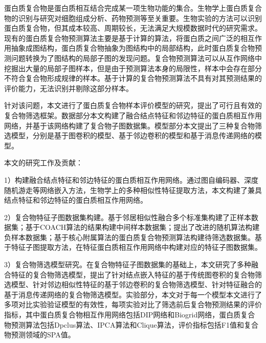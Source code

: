 \begin{cabstract}
  蛋白质复合物是蛋白质相互结合完成某一项生物功能的集合。生物学上蛋白质复合物的识别与研究对细胞组成分析、药物预测等至关重要。生物实验的方法可以识别蛋白质复合物，但其成本较高、周期较长，无法满足大规模数据时代的研究需求。
  现有的蛋白质复合物预测算法主要是基于计算的算法，将蛋白质之间广泛的相互作用抽象成图结构，蛋白质复合物抽象为图结构中的局部结构，此时蛋白质复合物预测问题转换为了图结构的局部子图的发现问题。复合物预测算法可以从互作网络中挖掘出大量的局部子图样本，但是由于预测算法本身的局限性，样本中会存在部分不符合复合物形成规律的样本。基于计算的复合物预测算法不具有对其预测结果的评价能力，无法识别并剔除这部分样本。

  针对该问题，本文进行了蛋白质复合物样本评价模型的研究，提出了可行且有效的复合物筛选框架。数据部分本文构建了融合结点特征和邻边特征的蛋白质相互作用网络，并基于该网络构建了复合物子图数据集。模型部分本文提出了三种复合物筛选模型，分别是基于图卷积的模型、基于邻边卷积的模型和基于消息传递网络的模型。

  本文的研究工作及贡献：

  1）构建融合结点特征和邻边特征的蛋白质相互作用网络。通过图自编码器、深度随机游走等网络嵌入方法，生物学上的多种相似性特征提取方法，本文构建了兼具结点特征和邻边特征的蛋白质相互作用网络。

  2）复合物特征子图数据集构建。基于邻居相似性融合多个标准集构建了正样本数据集；基于COACH算法的结果构建中间样本数据集；提出了改进的随机算法构建负样本数据集；基于核心附属算法的蛋白质复合物预测算法构建待筛选数据集。基于特征子图提取方法，在特征蛋白质相互作用网络中构建对应的特征子图数据集。

  3）复合物筛选模型研究。在复合物特征子图数据集的基础上，本文研究了多种融合特征的复合物筛选模型，提出了针对结点嵌入特征的基于传统图卷积的复合物筛选模型、针对邻边相似性特征的基于邻边卷积的复合物筛选模型、针对特征融合的基于消息传递网络的复合物筛选模型。实验部分，本文对于每一个模型本文进行了多项对比实验验证模型的有效性，每项实验对比了筛选前后复合物预测结果的评价指标，其中蛋白质复合物相互作用网络包括DIP网络和Biogrid网络，蛋白质复合物预测算法包括Dpclus算法、IPCA算法和Clique算法，评价指标包括F1值和复合物预测领域的SPA值。

\end{cabstract}


